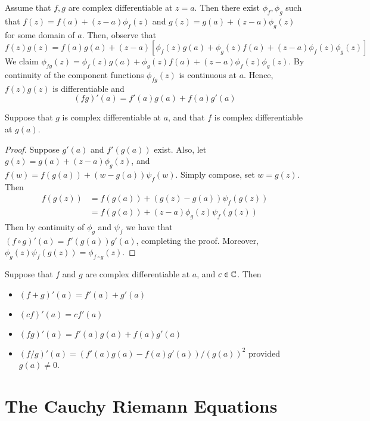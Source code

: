 Assume that $f,g$ are complex differentiable at $z = a$. Then there exist $\phi_f,\phi_g$ such that $f(z) = f(a) + (z-a)\phi_f(z)$ and $g(z) = g(a)+(z-a)\phi_g(z)$ for some domain of $a$. Then, observe that \begin{equation*}
    f(z)g(z) = f(a)g(a) + (z-a)[\phi_f(z)g(a)+\phi_g(z)f(a) + (z-a)\phi_f(z)\phi_g(z)]
\end{equation*}
We claim $\phi_{fg}(z) = \phi_f(z)g(a)+\phi_g(z)f(a) + (z-a)\phi_f(z)\phi_g(z)$. By continuity of the component functions $\phi_{fg}(z)$ is continuous at $a$. Hence, $f(z)g(z)$ is differentiable and \begin{equation*}
    (fg)'(a) = f'(a)g(a)+f(a)g'(a)
\end{equation*}


\begin{theorem}
    Suppose that $g$ is complex differentiable at $a$, and that $f$ is complex differentiable at $g(a)$.
\end{theorem}
\begin{proof}
    Suppose $g'(a)$ and $f'(g(a))$ exist. Also, let $g(z) = g(a)+(z-a)\phi_g(z)$, and $f(w) = f(g(a)) + (w-g(a))\psi_f(w)$. Simply compose, set $w = g(z)$. Then \begin{align*}
        f(g(z)) &= f(g(a)) + (g(z) - g(a))\psi_f(g(z)) \\
        &= f(g(a)) + (z-a)\phi_g(z)\psi_f(g(z))
    \end{align*}
    Then by continuity of $\phi_g$ and $\psi_f$ we have that $(f\circ g)'(a) = f'(g(a))g'(a)$, completing the proof. Moreover, $\phi_g(z) \psi_f(g(z)) = \phi_{f\circ g}(z)$.
\end{proof}

\begin{theorem}
    Suppose that $f$ and $g$ are complex differentiable at $a$, and $c \in \mathbb C$. Then \begin{itemize}
        \item $(f+g)'(a) = f'(a)+g'(a)$
        \item $(cf)'(a) = cf'(a)$
        \item $(fg)'(a) = f'(a)g(a) + f(a)g'(a)$
        \item $(f/g)'(a) = (f'(a)g(a) - f(a)g'(a))/(g(a))^2$ provided $g(a) \neq 0$.
    \end{itemize}
\end{theorem}


\section{The Cauchy Riemann Equations}

